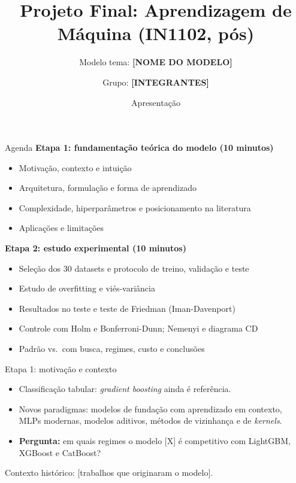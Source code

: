 \documentclass[aspectratio=169,11pt]{beamer}
\title[Projeto Final de AM (IN1102)]{Projeto Final: Aprendizagem de Máquina (IN1102, pós)}
\subtitle{Modelo tema: \textbf{[NOME DO MODELO]}}
\author{Grupo: \textbf{[INTEGRANTES]}}
\institute[CIn/UFPE]{Pós-graduação, CIn/UFPE, 2026.2}
\date{Apresentação}
\begin{document}
\begin{frame}
    \titlepage
\end{frame}

\begin{frame}{Agenda}
    \textbf{Etapa 1: fundamentação teórica do modelo (10 minutos)}
    \begin{itemize}
        \item Motivação, contexto e intuição
        \item Arquitetura, formulação e forma de aprendizado
        \item Complexidade, hiperparâmetros e posicionamento na literatura
        \item Aplicações e limitações
    \end{itemize}
    \textbf{Etapa 2: estudo experimental (10 minutos)}
    \begin{itemize}
        \item Seleção dos 30 datasets e protocolo de treino, validação e teste
        \item Estudo de overfitting e viés-variância
        \item Resultados no teste e teste de Friedman (Iman-Davenport)
        \item Controle com Holm e Bonferroni-Dunn; Nemenyi e diagrama CD
        \item Padrão vs.\ com busca, regimes, custo e conclusões
    \end{itemize}
\end{frame}


\begin{frame}{Etapa 1: motivação e contexto}
    \begin{itemize}
        \item Classificação tabular: \textit{gradient boosting} ainda é referência.
        \item Novos paradigmas: modelos de fundação com aprendizado em contexto, MLPs modernas, modelos aditivos, métodos de vizinhança e de \textit{kernels}.
        \item \textbf{Pergunta:} em quais regimes o modelo [X] é competitivo com LightGBM, XGBoost e CatBoost?
    \end{itemize}
    \vspace{0.4em}
    \footnotesize Contexto histórico: [trabalhos que originaram o modelo].
\end{frame}
\end{document}
